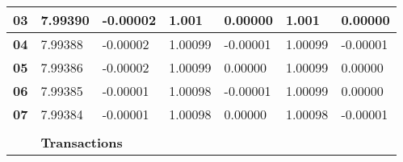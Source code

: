 \documentclass[../main.tex]{subfiles}
\begin{document}
\begin{table}[ht]
{\begin{tabular}{lllllll}
            \multicolumn{1}{|l|}{\textbf{03}}                  & \multicolumn{1}{l|}{7.99390}                                                       & \multicolumn{1}{l|}{-0.00002}           & \multicolumn{1}{l|}{1.001}              & \multicolumn{1}{l|}{0.00000}    & \multicolumn{1}{l|}{1.001}          & \multicolumn{1}{l|}{0.00000}    \\ \hline
            \multicolumn{1}{|l|}{\textbf{04}}                  & \multicolumn{1}{l|}{7.99388}                                                       & \multicolumn{1}{l|}{-0.00002}           & \multicolumn{1}{l|}{1.00099}            & \multicolumn{1}{l|}{-0.00001}   & \multicolumn{1}{l|}{1.00099}        & \multicolumn{1}{l|}{-0.00001}   \\ \hline
            \multicolumn{1}{|l|}{\textbf{05}}                  & \multicolumn{1}{l|}{7.99386}                                                       & \multicolumn{1}{l|}{-0.00002}           & \multicolumn{1}{l|}{1.00099}            & \multicolumn{1}{l|}{0.00000}    & \multicolumn{1}{l|}{1.00099}        & \multicolumn{1}{l|}{0.00000}    \\ \hline
            \multicolumn{1}{|l|}{\textbf{06}}                  & \multicolumn{1}{l|}{7.99385}                                                       & \multicolumn{1}{l|}{-0.00001}           & \multicolumn{1}{l|}{1.00098}            & \multicolumn{1}{l|}{-0.00001}   & \multicolumn{1}{l|}{1.00099}        & \multicolumn{1}{l|}{0.00000}    \\ \hline
            \multicolumn{1}{|l|}{\textbf{07}}                  & \multicolumn{1}{l|}{7.99384}                                                       & \multicolumn{1}{l|}{-0.00001}           & \multicolumn{1}{l|}{1.00098}            & \multicolumn{1}{l|}{0.00000}    & \multicolumn{1}{l|}{1.00098}        & \multicolumn{1}{l|}{-0.00001}   \\ \hline
                                                               &                                                                                    &                                         &                                         &                                 &                                     &                                 \\ \cline{2-7}
            \multicolumn{1}{c|}{}                              & \multicolumn{6}{l|}{\textbf{Transactions}}                                                                                                                                                                                                                                       \\ \cline{2-7}

\end{tabular}}
\end{table}
\end{document}
